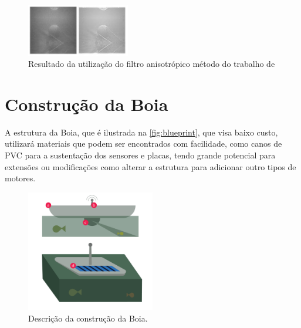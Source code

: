 \begin{figure}[ht]
	\centering
    \caption{\label{fig:anisotop}Resultado da utilização do filtro anisotrópico método do trabalho de }
	\includegraphics[width = 0.4\textwidth]{resources/anisitrop.png}
\end{figure}







\section{Construção da Boia}

A estrutura da Boia, que é ilustrada na \autoref{fig:blueprint}, que visa baixo custo, utilizará materiais que podem ser encontrados com facilidade, como canos de PVC para a sustentação dos sensores e placas, tendo grande potencial para extensões ou modificações como alterar a estrutura para adicionar outro tipos de motores.

\begin{figure}[htbp]
	\centering
      \caption{\label{fig:blueprint} Descrição da construção da Boia.}
	\includegraphics[width = 0.5\textwidth]{resources/blueprint.png}
\end{figure}

